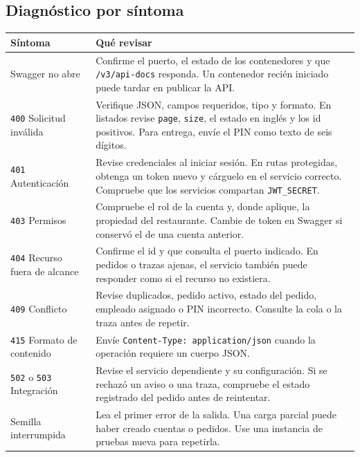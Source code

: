 \documentclass[11pt,a4paper]{article}
\newcommand{\code}[1]{\nolinkurl{#1}}
\begin{document}
\subsection{Diagnóstico por síntoma}
\begin{minipage}{\linewidth}
\begin{tabularx}{\linewidth}{@{}P{43mm}Y@{}}
\toprule
Síntoma & Qué revisar \\
\midrule
Swagger no abre & Confirme el puerto, el estado de los contenedores y que \code{/v3/api-docs} responda. Un contenedor recién iniciado puede tardar en publicar la API. \\
\code{400} Solicitud inválida & Verifique JSON, campos requeridos, tipo y formato. En listados revise \code{page}, \code{size}, el estado en inglés y los id positivos. Para entrega, envíe el PIN como texto de seis dígitos. \\
\code{401} Autenticación & Revise credenciales al iniciar sesión. En rutas protegidas, obtenga un token nuevo y cárguelo en el servicio correcto. Compruebe que los servicios compartan \code{JWT_SECRET}. \\
\code{403} Permisos & Compruebe el rol de la cuenta y, donde aplique, la propiedad del restaurante. Cambie de token en Swagger si conservó el de una cuenta anterior. \\
\code{404} Recurso fuera de alcance & Confirme el id y que consulta el puerto indicado. En pedidos o trazas ajenas, el servicio también puede responder como si el recurso no existiera. \\
\code{409} Conflicto & Revise duplicados, pedido activo, estado del pedido, empleado asignado o PIN incorrecto. Consulte la cola o la traza antes de repetir. \\
\code{415} Formato de contenido & Envíe \code{Content-Type: application/json} cuando la operación requiere un cuerpo JSON. \\
\code{502} o \code{503} Integración & Revise el servicio dependiente y su configuración. Si se rechazó un aviso o una traza, compruebe el estado registrado del pedido antes de reintentar. \\
Semilla interrumpida & Lea el primer error de la salida. Una carga parcial puede haber creado cuentas o pedidos. Use una instancia de pruebas nueva para repetirla. \\
\bottomrule
\end{tabularx}
\end{minipage}
\end{document}
